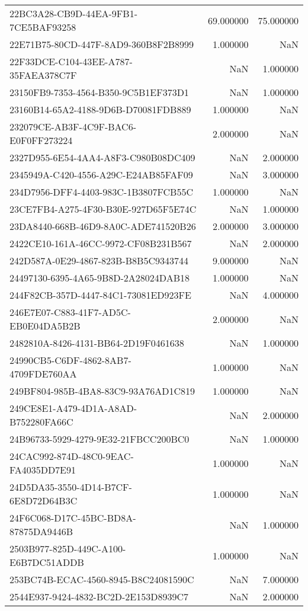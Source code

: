 \begin{tabular}{lrr}
22BC3A28-CB9D-44EA-9FB1-7CE5BAF93258 & 69.000000 & 75.000000 \\
22E71B75-80CD-447F-8AD9-360B8F2B8999 & 1.000000 & NaN \\
22F33DCE-C104-43EE-A787-35FAEA378C7F & NaN & 1.000000 \\
23150FB9-7353-4564-B350-9C5B1EF373D1 & NaN & 1.000000 \\
23160B14-65A2-4188-9D6B-D70081FDB889 & 1.000000 & NaN \\
232079CE-AB3F-4C9F-BAC6-E0F0FF273224 & 2.000000 & NaN \\
2327D955-6E54-4AA4-A8F3-C980B08DC409 & NaN & 2.000000 \\
2345949A-C420-4556-A29C-E24AB85FAF09 & NaN & 3.000000 \\
234D7956-DFF4-4403-983C-1B3807FCB55C & 1.000000 & NaN \\
23CE7FB4-A275-4F30-B30E-927D65F5E74C & NaN & 1.000000 \\
23DA8440-668B-46D9-8A0C-ADE741520B26 & 2.000000 & 3.000000 \\
2422CE10-161A-46CC-9972-CF08B231B567 & NaN & 2.000000 \\
242D587A-0E29-4867-823B-B8B5C9343744 & 9.000000 & NaN \\
24497130-6395-4A65-9B8D-2A28024DAB18 & 1.000000 & NaN \\
244F82CB-357D-4447-84C1-73081ED923FE & NaN & 4.000000 \\
246E7E07-C883-41F7-AD5C-EB0E04DA5B2B & 2.000000 & NaN \\
2482810A-8426-4131-BB64-2D19F0461638 & NaN & 1.000000 \\
24990CB5-C6DF-4862-8AB7-4709FDE760AA & 1.000000 & NaN \\
249BF804-985B-4BA8-83C9-93A76AD1C819 & 1.000000 & NaN \\
249CE8E1-A479-4D1A-A8AD-B752280FA66C & NaN & 2.000000 \\
24B96733-5929-4279-9E32-21FBCC200BC0 & NaN & 1.000000 \\
24CAC992-874D-48C0-9EAC-FA4035DD7E91 & 1.000000 & NaN \\
24D5DA35-3550-4D14-B7CF-6E8D72D64B3C & 1.000000 & NaN \\
24F6C068-D17C-45BC-BD8A-87875DA9446B & NaN & 1.000000 \\
2503B977-825D-449C-A100-E6B7DC51ADDB & 1.000000 & NaN \\
253BC74B-ECAC-4560-8945-B8C24081590C & NaN & 7.000000 \\
2544E937-9424-4832-BC2D-2E153D8939C7 & NaN & 2.000000 \\

\end{tabular}

